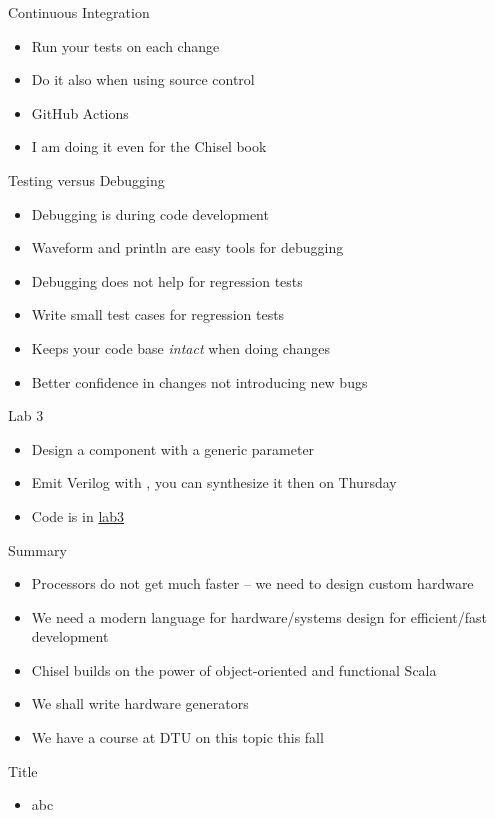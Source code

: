 \begin{frame}[fragile]{Continuous Integration}
\begin{itemize}
\item Run your tests on each change
\item Do it also when using source control
\item GitHub Actions
\item I am doing it even for the Chisel book
\end{itemize}
\end{frame}

\begin{frame}[fragile]{Testing versus Debugging}
\begin{itemize}
\item Debugging is during code development
\item Waveform and println are easy tools for debugging
\item Debugging does not help for regression tests
\item Write small test cases for regression tests
\item Keeps your code base \emph{intact} when doing changes
\item Better confidence in changes not introducing new bugs
\end{itemize}
\end{frame}

\begin{frame}[fragile]{Lab 3}
\begin{itemize}
\item Design a component with a generic parameter
\item Emit Verilog with , you can synthesize it then on Thursday
\item Code is in \href{https://github.com/schoeberl/agile-hw/tree/main/lab3}{lab3}
\end{itemize}
\end{frame}

\begin{frame}[fragile]{Summary}
\begin{itemize}
\item Processors do not get much faster -- we need to design custom hardware
\item We need a modern language for hardware/systems design for efficient/fast development
\item Chisel builds on the power of object-oriented and functional Scala
\item We shall write hardware generators
\item We have a course at DTU on this topic this fall
\end{itemize}
\end{frame}




\begin{frame}[fragile]{Title}
\begin{itemize}
\item abc
\end{itemize}
\end{frame}
